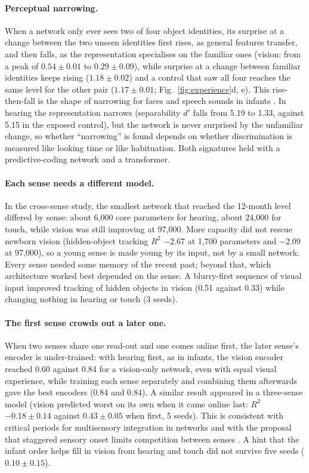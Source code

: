 \documentclass{article}
\begin{document}
\paragraph{Perceptual narrowing.} When a network only ever sees two of four object identities, its surprise at a change between the two unseen identities first rises, as general features transfer, and then falls, as the representation specialises on the familiar ones (vision: from a peak of $0.54 \pm 0.01$ to $0.29 \pm 0.09$), while surprise at a change between familiar identities keeps rising ($1.18 \pm 0.02$) and a control that saw all four reaches the same level for the other pair ($1.17 \pm 0.01$; Fig.~\ref{fig:experience}d, e). This rise-then-fall is the shape of narrowing for faces and speech sounds in infants \autocite{pascalis2002species,werker1984cross,maurer2014perceptual}. In hearing the representation narrows (separability $d'$ falls from 5.19 to 1.33, against 5.15 in the exposed control), but the network is never surprised by the unfamiliar change, so whether ``narrowing'' is found depends on whether discrimination is measured like looking time or like habituation. Both signatures held with a predictive-coding network \autocite{rao1999predictive} and a transformer.

\paragraph{Each sense needs a different model.} In the cross-sense study, the smallest network that reached the 12-month level differed by sense: about 6,000 core parameters for hearing, about 24,000 for touch, while vision was still improving at 97,000. More capacity did not rescue newborn vision (hidden-object tracking $R^2$ $-2.67$ at 1,700 parameters and $-2.09$ at 97,000), so a young sense is made young by its input, not by a small network. Every sense needed some memory of the recent past; beyond that, which architecture worked best depended on the sense. A blurry-first sequence of visual input improved tracking of hidden objects in vision (0.51 against 0.33) while changing nothing in hearing or touch (3 seeds).

\paragraph{The first sense crowds out a later one.} When two senses share one read-out and one comes online first, the later sense's encoder is under-trained: with hearing first, as in infants, the vision encoder reached 0.60 against 0.84 for a vision-only network, even with equal visual experience, while training each sense separately and combining them afterwards gave the best encoders (0.84 and 0.84). A similar result appeared in a three-sense model (vision predicted worst on its own when it came online last: $R^2$ $-0.18 \pm 0.14$ against $0.43 \pm 0.05$ when first, 5 seeds). This is consistent with critical periods for multisensory integration in networks \autocite{kleinman2023critical} and with the proposal that staggered sensory onset limits competition between senses \autocite{turkewitz1982limitations}. A hint that the infant order helps fill in vision from hearing and touch did not survive five seeds ($0.10 \pm 0.15$).
\end{document}
